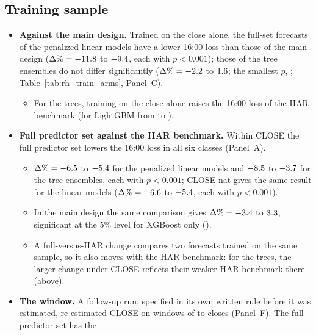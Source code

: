 \subsection{Training sample}
\label{sec:rh_econ_last30}
\label{sec:rh_results_pooled}
\begin{itemize}
\item \textbf{Against the main design.} Trained on the close alone, the full-set forecasts of the penalized linear
  models have a lower 16:00 loss than those of the main design ($\Delta\% = -11.8$ to
  $-9.4$, each with $p < 0.001$); those of the tree ensembles do not differ significantly
  ($\Delta\% = -2.2$ to $1.6$; the smallest $p$,
  \rhtaTreeClVsRthClosePMin; Table~\ref{tab:rh_train_arms}, Panel~C).
  \begin{itemize}
  \item For the trees, training on the close alone raises the 16:00 loss of the HAR benchmark (for LightGBM from
    \rhtaQHarLgbmRthClose{} to \rhtaQHarLgbmClClose).
  \end{itemize}
\item \textbf{Full predictor set against the HAR benchmark.} Within CLOSE the full predictor set lowers the 16:00
  loss in all six classes (Panel~A).
  \begin{itemize}
  \item $\Delta\% = -6.5$ to $-5.4$ for the penalized linear models and
    $-8.5$ to $-3.7$ for the tree ensembles, each with $p < 0.001$; CLOSE-nat
    gives the same result for the linear models ($\Delta\% = -6.6$ to
    $-5.4$, each with $p < 0.001$).
  \item In the main design the same comparison gives $\Delta\% = -3.4$ to $3.3$,
    significant at the 5\% level for XGBoost only (\rhtaPXgbRthClose).
  \item A full-versus-HAR change compares two forecasts trained on the same sample, so it also moves with the HAR
    benchmark: for the trees, the larger change under CLOSE reflects their weaker HAR benchmark there (above).
  \end{itemize}
\item \textbf{The window.} A follow-up run, specified in its own written rule before it was estimated,
  re-estimated CLOSE on windows of \rhtaWsMin{} to \rhtaWsMax{} closes (Panel~F). The full predictor set has the

\end{itemize}
